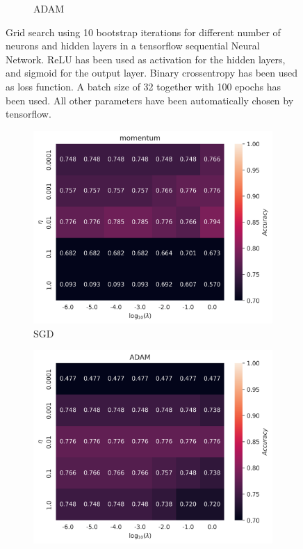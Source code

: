 \documentclass[11pt]{article}
\begin{document}
\begin{figure}[H]
\begin{subfigure}{.5\textwidth}
        \caption{ADAM}
        \label{fig:}
    \end{subfigure}
    \caption{Grid search using 10 bootstrap iterations for different number of neurons and hidden layers in a tensorflow sequential Neural Network. ReLU has been used as activation for the hidden layers, and sigmoid for the output layer. Binary crossentropy has been used as loss function. A batch size of 32 together with 100 epochs has been used. All other parameters have been automatically chosen by tensorflow.}
    \label{fig:cobar_grid}
\end{figure}
\begin{figure}[H]
    \begin{subfigure}{.5\textwidth}
        \centering
        \includegraphics[width=\textwidth]{../figures/logreg_momentum_Cobar.png}
        \caption{SGD}
        \label{fig:}
    \end{subfigure}
    \begin{subfigure}{.5\textwidth}
        \centering
        \includegraphics[width=\textwidth]{../figures/logreg_ADAM_Cobar.png}

\end{subfigure}
\end{figure}
\end{document}
